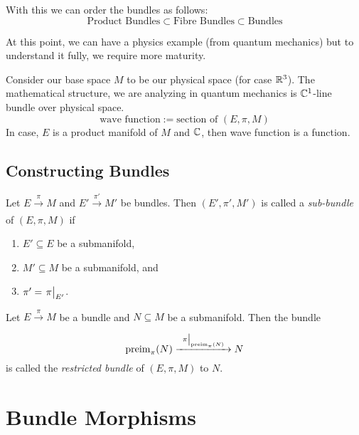 \noindent With this we can order the bundles as follows:
\begin{equation}
	\text{Product Bundles} \subset \text{Fibre Bundles} \subset \text{Bundles}
\end{equation}

At this point, we can have a physics example (from quantum mechanics) but to understand it fully, we require more maturity.
\begin{example}
	Consider our base space \(M\) to be our physical space (for case \(\mathbb R^3\)). The mathematical structure, we are analyzing in quantum mechanics is \(\mathbb C^1\)-line bundle over physical space.
	\begin{equation}
		\text{wave function} := \text{section of \((E, \pi, M)\)}
	\end{equation}
	In case, \(E\) is a product manifold of \(M\) and \(\mathbb C\), then wave function is a function.
\end{example}

\subsection{Constructing Bundles}

\begin{definition}
	Let \(E \xrightarrow[]{\ \pi\ } M\) and \(E' \xrightarrow[]{\ \pi'\ } M'\) be bundles. Then \((E', \pi', M')\) is called a \emph{sub-bundle} of \((E, \pi, M)\) if
	\begin{enumerate}
		\item \(E' \subseteq E\) be a submanifold,
		\item \(M' \subseteq M\) be a submanifold, and
		\item \(\pi' = \eval{\pi}_{E'}\).
	\end{enumerate}
\end{definition}

\begin{definition}
	Let \(E \xrightarrow[]{\ \pi\ } M\) be a bundle and \(N \subseteq M\) be a submanifold. Then the bundle
	\begin{equation}
		\preimg_{\pi}(N) \xrightarrow[]{\ \eval{\pi}_{\preimg_{\pi}(N)}\ } N
	\end{equation}
	is called the \emph{restricted bundle} of \((E, \pi, M)\) to \(N\).
\end{definition}

\section{Bundle Morphisms}


